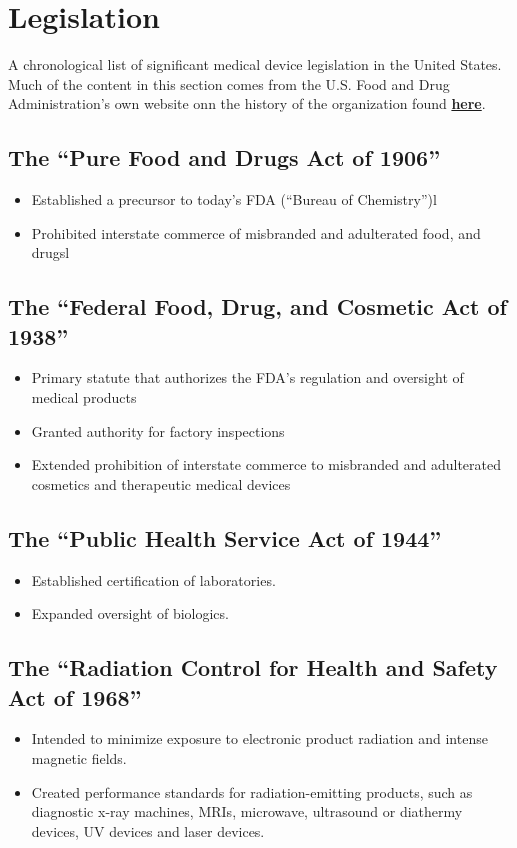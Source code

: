 \documentclass[11pt]{book}
\begin{document}
\newpage
\section{Legislation}
A chronological list of significant medical device legislation in the United States. Much of the content in this section comes from the U.S. Food and Drug Administration's own website onn the history of the organization found \href{https://www.fda.gov/MedicalDevices/DeviceRegulationandGuidance/Overview/ucm618375.htm}{\textbf{here}}.

\subsection{The ``Pure Food and Drugs Act of 1906''}
\begin{itemize}
	\item Established a precursor to today’s FDA (``Bureau of Chemistry'')l
	\item Prohibited interstate commerce of misbranded and adulterated food, and drugsl
\end{itemize}

\subsection{The ``Federal Food, Drug, and Cosmetic Act of 1938''}
\begin{itemize}
	\item Primary statute that authorizes the FDA’s regulation and oversight of medical products
	\item Granted authority for factory inspections
	\item Extended prohibition of interstate commerce to misbranded and adulterated cosmetics and therapeutic medical devices
\end{itemize}

\subsection{The ``Public Health Service Act of 1944''}
\begin{itemize}
	\item Established certification of laboratories.
	\item Expanded oversight of biologics.
\end{itemize}

\subsection{The ``Radiation Control for Health and Safety Act of 1968''}
\begin{itemize}
	\item Intended to minimize exposure to electronic product radiation and intense magnetic fields.
	\item Created performance standards for radiation-emitting products, such as diagnostic x-ray machines, MRIs, microwave, ultrasound or diathermy devices, UV devices and laser devices.
\end{itemize}
\end{document}

